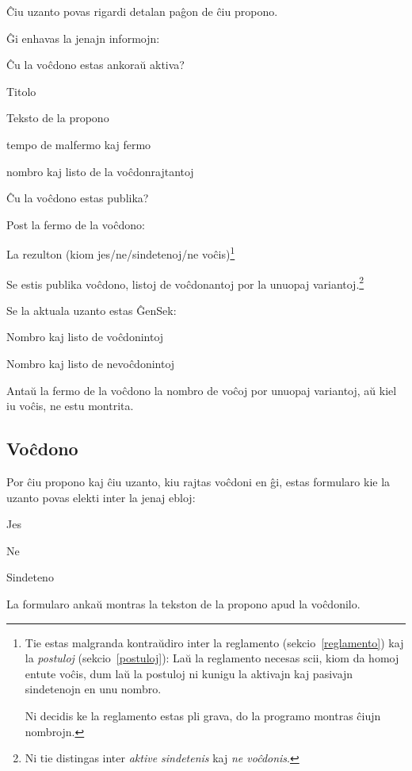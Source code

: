 \documentclass[draft]{scrartcl}
\newenvironment{itemize*}{%
  \begin{itemize}%
  \setlength{\itemsep}{0pt}%
  \setlength{\parsep}{0pt}%
  \setlength{\parskip}{2pt plus 1pt}
  \setlength{\topsep}{1pt}%
}{%
    \end{itemize}%
}
\begin{document}
Ĉiu uzanto povas rigardi detalan paĝon de ĉiu propono.

Ĝi enhavas la jenajn informojn:
\begin{itemize*}
\item Ĉu la voĉdono estas ankoraŭ aktiva?
\item Titolo
\item Teksto de la propono
\item tempo de malfermo kaj fermo
\item nombro kaj listo de la voĉdonrajtantoj
\item Ĉu la voĉdono estas publika?
\end{itemize*}
Post la fermo de la voĉdono:
\begin{itemize*}
\item La rezulton (kiom jes/ne/sindetenoj/ne voĉis)\footnote{%
    Tie estas malgranda kontraŭdiro inter la reglamento
    (sekcio~\ref{reglamento}) kaj la \emph{postuloj} (sekcio~\ref{postuloj}):
    Laŭ la reglamento necesas scii, kiom da homoj entute voĉis, dum laŭ
    la postuloj ni kunigu la aktivajn kaj pasivajn sindetenojn en unu nombro.
    \par
    Ni decidis ke la reglamento estas pli grava, do la programo montras ĉiujn
    nombrojn.
  }
\item Se estis publika voĉdono, listoj de voĉdonantoj por la
  unuopaj variantoj.\footnote{Ni tie distingas inter \emph{aktive sindetenis}
    kaj \emph{ne voĉdonis}.}
\end{itemize*}
Se la aktuala uzanto estas ĜenSek:
\begin{itemize*}
\item Nombro kaj listo de voĉdonintoj
\item Nombro kaj listo de nevoĉdonintoj
\end{itemize*}

Antaŭ la fermo de la voĉdono la nombro de voĉoj por unuopaj variantoj,
aŭ kiel iu voĉis, ne estu montrita.

\subsection{Voĉdono}

Por ĉiu propono kaj ĉiu uzanto, kiu rajtas voĉdoni en ĝi,
estas formularo kie la uzanto povas elekti inter la jenaj
ebloj:
\begin{itemize*}
\item Jes
\item Ne
\item Sindeteno
\end{itemize*}
La formularo ankaŭ montras la tekston de la propono apud la
voĉdonilo.
\end{document}
